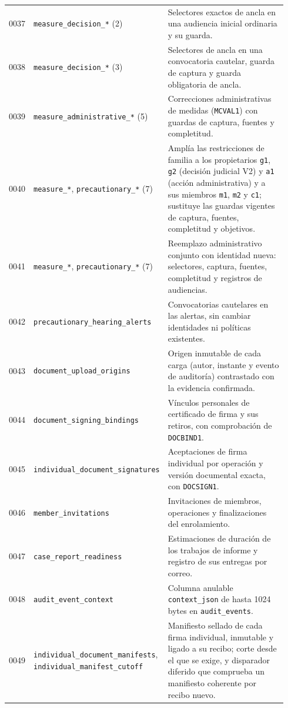 \begin{longtable}{@{}C{0.06\linewidth}L{0.29\linewidth}L{0.59\linewidth}@{}}
  0037 & \texttt{measure\_decision\_*} (2) & Selectores exactos de ancla en una audiencia inicial ordinaria y su guarda. \\
  0038 & \texttt{measure\_decision\_*} (3) & Selectores de ancla en una convocatoria cautelar, guarda de captura y guarda obligatoria de ancla. \\
  0039 & \texttt{measure\_administrative\_*} (5) & Correcciones administrativas de medidas (\texttt{MCVAL1}) con guardas de captura, fuentes y completitud. \\
  0040 & \texttt{measure\_*}, \texttt{precautionary\_*} (7) & Amplía las restricciones de familia a los propietarios \texttt{g1}, \texttt{g2} (decisión judicial V2) y \texttt{a1} (acción administrativa) y a sus miembros \texttt{m1}, \texttt{m2} y \texttt{c1}; sustituye las guardas vigentes de captura, fuentes, completitud y objetivos. \\
  0041 & \texttt{measure\_*}, \texttt{precautionary\_*} (7) & Reemplazo administrativo conjunto con identidad nueva: selectores, captura, fuentes, completitud y registros de audiencias. \\
  0042 & \texttt{precautionary\_hearing\_alerts} & Convocatorias cautelares en las alertas, sin cambiar identidades ni políticas existentes. \\
  0043 & \texttt{document\_upload\_origins} & Origen inmutable de cada carga (autor, instante y evento de auditoría) contrastado con la evidencia confirmada. \\
  0044 & \texttt{document\_signing\_bindings} & Vínculos personales de certificado de firma y sus retiros, con comprobación de \texttt{DOCBIND1}. \\
  0045 & \texttt{individual\_document\_signatures} & Aceptaciones de firma individual por operación y versión documental exacta, con \texttt{DOCSIGN1}. \\
  0046 & \texttt{member\_invitations} & Invitaciones de miembros, operaciones y finalizaciones del enrolamiento. \\
  0047 & \texttt{case\_report\_readiness} & Estimaciones de duración de los trabajos de informe y registro de sus entregas por correo. \\
  0048 & \texttt{audit\_event\_context} & Columna anulable \texttt{context\_json} de hasta 1024 bytes en \texttt{audit\_events}. \\
  0049 & \texttt{individual\_document\_manifests}, \texttt{individual\_manifest\_cutoff} & Manifiesto sellado de cada firma individual, inmutable y ligado a su recibo; corte desde el que se exige, y disparador diferido que comprueba un manifiesto coherente por recibo nuevo. \\

\end{longtable}

